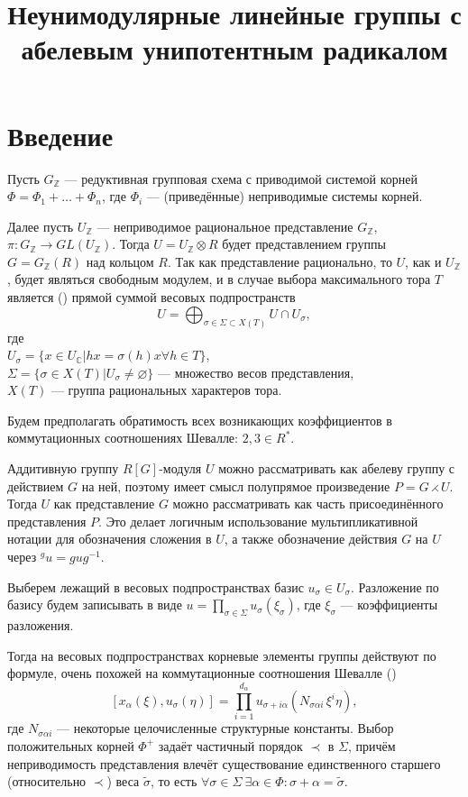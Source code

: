\documentclass[10pt]{article}
\title{Неунимодулярные линейные группы с абелевым унипотентным радикалом}
\author{}
\date{}
\theoremstyle{remark}
\newcommand{\Z}{\mathbb{Z}}
\renewcommand{\C}{\mathbb{C}}
\begin{document}

\sloppy

\section{Введение}

Пусть $G_\Z$ --- редуктивная групповая схема с приводимой системой корней $\Phi = \Phi_1 + \dots + \Phi_n$, где $\Phi_i$ --- (приведённые) неприводимые системы корней.

Далее пусть $U_\Z$ --- неприводимое рациональное представление $G_\Z$, $\pi:G_\Z \to GL(U_\Z)$. Тогда $U=U_\Z\otimes R$ будет представлением группы $G=G_\Z(R)$ над кольцом $R$. Так как представление рационально, то $U$, как и $U_\Z$, будет являться свободным модулем, и в случае выбора максимального тора $T$ является (\citep{Borel1970}) прямой суммой весовых подпространств
$$U=\bigoplus_{\sigma \in \Sigma \subset X(T)} {U \cap U_\sigma} ,$$
где\\
$U_\sigma = \{x \in U_\C | h x = \sigma(h) x \forall h \in T \}$,\\
$\Sigma = \{\sigma \in X(T) | U_\sigma \ne \varnothing\}$ --- множество весов представления,\\
$X(T)$ --- группа рациональных характеров тора.

Будем предполагать обратимость всех возникающих коэффициентов в коммутационных соотношениях Шевалле: $2,3 \in R^* $. %

Аддитивную группу $R[G]$-модуля $U$ можно рассматривать как абелеву группу с действием $G$ на ней, поэтому
имеет смысл полупрямое произведение $P = G \rightthreetimes U$.
Тогда $U$ как представление $G$ можно рассматривать как часть присоединённого представления $P$. Это делает логичным использование мультипликативной нотации для обозначения сложения в $U$, а также обозначение действия $G$ на $U$ через $^{g}u = g u g^{-1}$. 

Выберем лежащий в весовых подпространствах базис $u_\sigma \in U_\sigma$. Разложение по базису будем записывать в виде $u = \prod_{\sigma \in \Sigma} u_\sigma(\xi_\sigma)$, где $\xi_\sigma$ --- коэффициенты разложения.

Тогда на весовых подпространствах корневые элементы группы действуют по формуле, очень похожей на коммутационные соотношения Шевалле (\citep{StepanovDissert})
\begin{equation}\label{eq:commutator_relation}
[x_\alpha(\xi), u_\sigma(\eta)] = \prod_{i=1}^{d_\alpha} u_{\sigma+i\alpha}(N_{\sigma\alpha i}\,\xi^i \eta),
\end{equation}
где $N_{\sigma\alpha i}$ ---  некоторые целочисленные структурные константы. Выбор положительных корней $\Phi^+$ задаёт частичный порядок $\prec$ в $\Sigma$, причём неприводимость представления влечёт существование единственного старшего (относительно $\prec$) веса $\widetilde{\sigma}$, то есть $\forall \sigma \in \Sigma \  \exists \alpha \in \Phi : \sigma+\alpha = \widetilde{\sigma}$.
\end{document}
